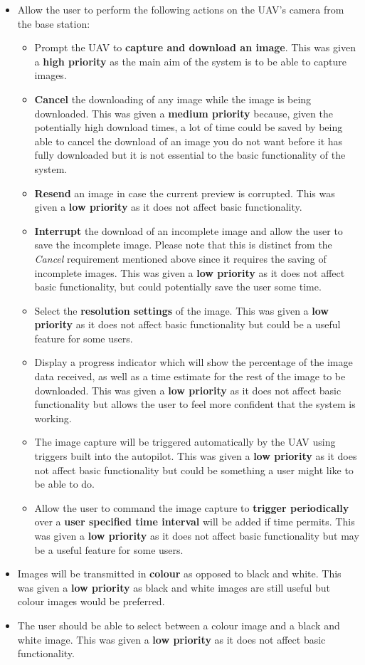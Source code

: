 \begin{itemize}
	\item Allow the user to perform the following actions on the UAV’s camera from the base station:
	\begin{itemize}
		\item Prompt the UAV to \textbf{capture and download an image}. This was given a \textbf{high priority} as the main aim of the system is to be able to capture images.
		\item \textbf{Cancel} the downloading of any image while the image is being downloaded. This was given a \textbf{medium priority} because, given the potentially high download times, a lot of time could be saved by being able to cancel the download of an image you do not want before it has fully downloaded but it is not essential to the basic functionality of the system.
		\item \textbf{Resend} an image in case the current preview is corrupted. This was given a \textbf{low priority} as it does not affect basic functionality.
		\item \textbf{Interrupt} the download of an incomplete image and allow the user to save the incomplete image. Please note that this is distinct from the \emph{Cancel} requirement mentioned above since it requires the saving of incomplete images. This was given a \textbf{low priority} as it does not affect basic functionality, but could potentially save the user some time.
		\item Select the \textbf{resolution settings} of the image. This was given a \textbf{low priority} as it does not affect basic functionality but could be a useful feature for some users.
		\item Display a progress indicator which will show the percentage of the image data received, as well as a time estimate for the rest of the image to be downloaded. This was given a \textbf{low priority} as it does not affect basic functionality but allows the user to feel more confident that the system is working.
		\item The image capture will be triggered automatically by the UAV using triggers built into the autopilot. This was given a \textbf{low priority} as it does not affect basic functionality but could be something a user might like to be able to do.
		\item Allow the user to command the image capture to \textbf{trigger periodically} over a \textbf{user specified time interval} will be added if time permits. This was given a \textbf{low priority} as it does not affect basic functionality but may be a useful feature for some users.
	\end{itemize}
	\item Images will be transmitted in \textbf{colour} as opposed to black and white. This was given a \textbf{low priority} as black and white images are still useful but colour images would be preferred.
	\item The user should be able to select between a colour image and a black and white image. This was given a \textbf{low priority} as it does not affect basic functionality.
\end{itemize}


